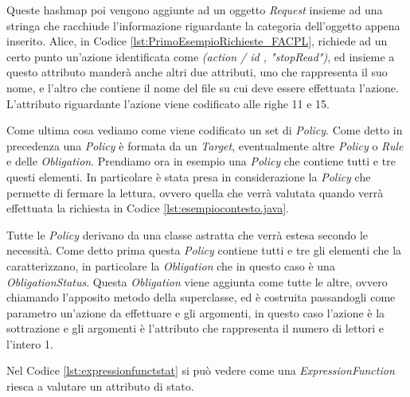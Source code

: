 Queste hashmap poi vengono aggiunte ad un oggetto \textit{Request} insieme ad una stringa che racchiude l'informazione riguardante la categoria dell'oggetto appena inserito.
Alice, in Codice \ref{lst:PrimoEsempioRichieste_FACPL}, richiede ad un certo punto un'azione identificata come \textit{(action / id , "stopRead")}, ed insieme a questo attributo manderà anche altri due attributi, uno che rappresenta il suo nome, e l'altro che contiene il nome del file su cui deve essere effettuata l'azione. L'attributo riguardante l'azione viene codificato alle righe 11 e 15.\\ \par
Come ultima cosa vediamo come viene codificato un set di \textit{Policy}. Come detto in precedenza una \textit{Policy} è formata da un \textit{Target}, eventualmente altre \textit{Policy} o \textit{Rule} e delle \textit{Obligation}. Prendiamo ora in esempio una \textit{Policy} che contiene tutti e tre questi elementi.
In particolare è stata presa in considerazione la \textit{Policy} che permette di fermare la lettura, ovvero quella che verrà valutata quando verrà effettuata la richiesta in Codice \ref{lst:esempiocontesto.java}.\\ \par
Tutte le \textit{Policy} derivano da una classe astratta che verrà estesa secondo le necessità. Come detto prima questa \textit{Policy} contiene tutti e tre gli elementi che la caratterizzano, in particolare la \textit{Obligation} che in questo caso è una \textit{ObligationStatus}. Questa \textit{Obligation} viene aggiunta come tutte le altre, ovvero chiamando l'apposito metodo della superclasse, ed è costruita passandogli come parametro un'azione da effettuare e gli argomenti, in questo caso l'azione è la sottrazione e gli argomenti è l'attributo che rappresenta il numero di lettori e l'intero 1. \\ \par
{}
Nel Codice \ref{lst:expressionfunctstat} si può vedere come una \textit{ExpressionFunction} riesca a valutare un attributo di stato.


    

